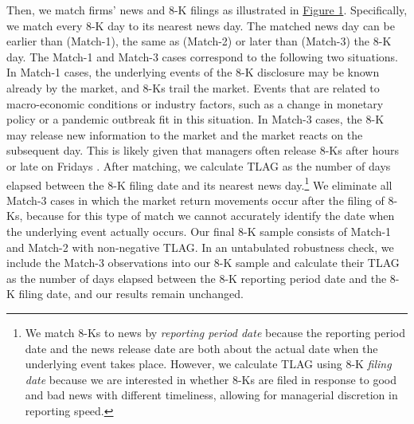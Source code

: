 \documentclass[letterpaper,12pt]{article}
\begin{document}
\begin{spacing}{1.5}
Then, we match firms' news and 8-K filings as illustrated in \hyperref[fig1]{Figure 1}. Specifically, we match every 8-K day to its nearest news day. The matched news day can be earlier than (Match-1), the same as (Match-2) or later than (Match-3) the 8-K day. The Match-1 and Match-3 cases correspond to the following two situations. In Match-1 cases, the underlying events of the 8-K disclosure may be known already by the market, and 8-Ks trail the market. Events that are related to macro-economic conditions or industry factors, such as a change in monetary policy or a pandemic outbreak fit in this situation. In Match-3 cases, the 8-K may release new information to the market and the market reacts on the subsequent day. This is likely given that managers often release 8-Ks after hours or late on Fridays \cite{segalAreManagersStrategic2016}. After matching, we calculate TLAG as the number of days elapsed between the 8-K filing date and its nearest news day.\footnote{We match 8-Ks to news by \textit{reporting period date} because the reporting period date and the news release date are both about the actual date when the underlying event takes place. However, we calculate TLAG using 8-K \textit{filing date} because we are interested in whether 8-Ks are filed in response to good and bad news with different timeliness, allowing for managerial discretion in reporting speed.} We eliminate all Match-3 cases in which the market return movements occur after the filing of 8-Ks, because for this type of match we cannot accurately identify the date when the underlying event actually occurs. Our final 8-K sample consists of Match-1 and Match-2 with non-negative TLAG. In an untabulated robustness check, we include the Match-3 observations into our 8-K sample and calculate their TLAG as the number of days elapsed between the 8-K reporting period date and the 8-K filing date, and our results remain unchanged. 


\end{spacing}
\end{document}

